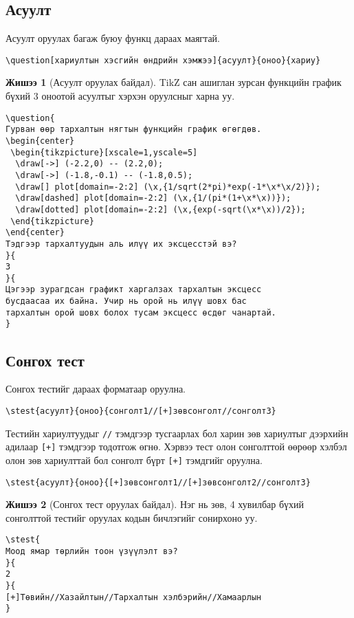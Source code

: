 \documentclass[10pt]{article}
\theoremstyle{definition}
\newtheorem{example}{Жишээ}
\begin{document}
\subsection{Асуулт}

Асуулт оруулах багаж буюу функц дараах маягтай.
\begin{verbatim}
\question[хариултын хэсгийн өндрийн хэмжээ]{асуулт}{оноо}{хариу}
\end{verbatim}

\begin{example}[Асуулт оруулах байдал]
TikZ сан ашиглан зурсан функцийн график бүхий 3 оноотой асуултыг хэрхэн оруулсныг харна уу.
\begin{verbatim}
\question{
Гурван өөр тархалтын нягтын функцийн график өгөгдөв.
\begin{center}
 \begin{tikzpicture}[xscale=1,yscale=5]
  \draw[->] (-2.2,0) -- (2.2,0);
  \draw[->] (-1.8,-0.1) -- (-1.8,0.5);
  \draw[] plot[domain=-2:2] (\x,{1/sqrt(2*pi)*exp(-1*\x*\x/2)});
  \draw[dashed] plot[domain=-2:2] (\x,{1/(pi*(1+\x*\x))});
  \draw[dotted] plot[domain=-2:2] (\x,{exp(-sqrt(\x*\x))/2});
 \end{tikzpicture}
\end{center}
Тэдгээр тархалтуудын аль илүү их эксцесстэй вэ?
}{
3
}{
Цэгээр зурагдсан графикт харгалзах тархалтын эксцесс 
бусдаасаа их байна. Учир нь орой нь илүү шовх бас 
тархалтын орой шовх болох тусам эксцесс өсдөг чанартай.
}
\end{verbatim}
\end{example}

\subsection{Сонгох тест}

Сонгох тестийг дараах форматаар оруулна.
\begin{verbatim}
\stest{асуулт}{оноо}{сонголт1//[+]зөвсонголт//сонголт3}
\end{verbatim}
Тестийн хариултуудыг \texttt{//} тэмдгээр тусгаарлах бол харин зөв хариултыг дээрхийн адилаар \texttt{[+]} тэмдгээр тодотгож өгнө. Хэрвээ тест олон сонголттой өөрөөр хэлбэл олон зөв хариулттай бол сонголт бүрт \texttt{[+]} тэмдгийг оруулна.
\begin{verbatim}
\stest{асуулт}{оноо}{[+]зөвсонголт1//[+]зөвсонголт2//сонголт3}
\end{verbatim}

\begin{example}[Сонгох тест оруулах байдал]
Нэг нь зөв, 4 хувилбар бүхий сонголттой тестийг оруулах кодын бичлэгийг сонирхоно уу.
\begin{verbatim}
\stest{
Моод ямар төрлийн тоон үзүүлэлт вэ?
}{
2
}{
[+]Төвийн//Хазайлтын//Тархалтын хэлбэрийн//Хамаарлын
}
\end{verbatim}
\end{example}
\end{document}
